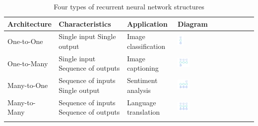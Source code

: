 \begin{table}
    \centering
    \begin{tabular}{p{}p{}p{}p{}}
        \toprule
        \textbf{Architecture} & \textbf{Characteristics} & \textbf{Application} & \textbf{Diagram} \\
        \midrule

        One-to-One & Single input \newline Single output & Image classification & 
        \includegraphics[width=0.08\textwidth]{Figures/onetoone.png} \\

        One-to-Many & Single input \newline Sequence of outputs & Image captioning & 
        \includegraphics[width=0.16\textwidth]{Figures/onetomany.png} \\

        Many-to-One & Sequence of inputs \newline Single output & Sentiment analysis & 
        \includegraphics[width=0.16\textwidth]{Figures/manytoone.png} \\

        Many-to-Many & Sequence of inputs \newline Sequence of outputs & Language translation & 
        \includegraphics[width=0.16\textwidth]{Figures/manytomany.png} \\

        \bottomrule\\
    \end{tabular}
    \caption{Four types of recurrent neural network structures}
    \label{tab:RNNStructures}
\end{table}

